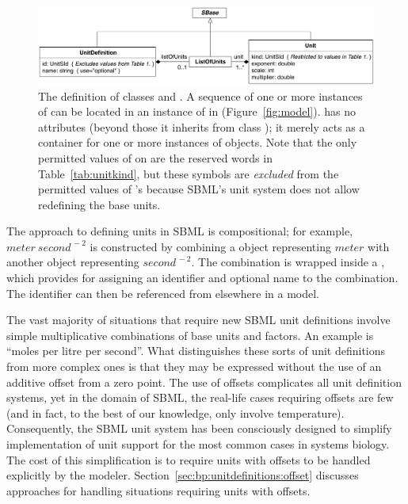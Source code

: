 \begin{figure}[htb]
  \centering
  \vspace*{-1ex}
  \includegraphics[scale=0.78]{figs/unitdefinition-uml}
  \caption{The definition of classes \UnitDefinition and
      \Unit.  A sequence of one or more instances of
      \UnitDefinition can be located in an instance of
      \ListOfUnitDefinitions in \Model
      (Figure~\protect\ref{fig:model}).  \ListOfUnits has
      no attributes (beyond those it inherits from class \SBase);
      it merely acts as a container for one or more instances of
      \Unit objects.  Note that the only permitted values of
       on \Unit are the reserved words in
      Table~\vref{tab:unitkind}, but these symbols are
      \emph{excluded} from the permitted values of
      \UnitDefinition's  because SBML's unit system does
      not allow redefining the base units.}
  \label{fig:unitdefinition}
\end{figure}

The approach to defining units in SBML is compositional; for
example, $meter\ second^{\,-2}$ is constructed by combining a
\Unit object representing $meter$ with another \Unit object
representing $second^{\,-2}$.  The combination is wrapped inside a
\UnitDefinition, which provides for assigning an identifier and
optional name to the combination.  The identifier can then be
referenced from elsewhere in a model.

The vast majority of situations that require new SBML unit
definitions involve simple multiplicative combinations of base
units and factors.  An example is ``moles per litre per second''.
What distinguishes these sorts of unit definitions from more
complex ones is that they may be expressed without the use of an
additive offset from a zero point.  The use of offsets complicates
all unit definition systems, yet in the domain of SBML, the
real-life cases requiring offsets are few (and in fact, to the
best of our knowledge, only involve temperature).  Consequently,
the SBML unit system has been consciously designed to simplify
implementation of unit support for the most common cases in
systems biology.  The cost of this simplification is to require
units with offsets to be handled explicitly by the modeler.
Section~\ref{sec:bp:unitdefinitions:offset} discusses approaches
for handling situations requiring units with offsets.


